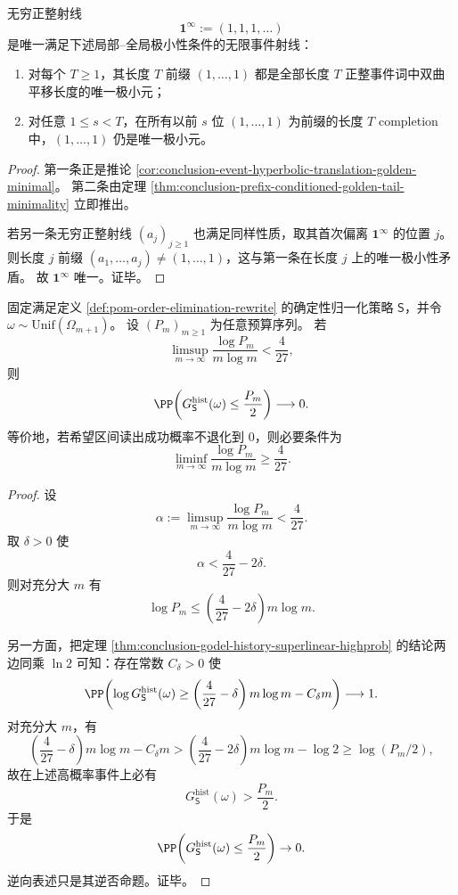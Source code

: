\begin{corollary}[全局最短历史射线的唯一性]\label{cor:conclusion-unique-global-shortest-history-ray}
无穷正整射线
\[
\mathbf 1^\infty:=(1,1,1,\dots)
\]
是唯一满足下述局部--全局极小性条件的无限事件射线：
\begin{enumerate}
  \item 对每个 \(T\ge 1\)，其长度 \(T\) 前缀 \((1,\dots,1)\) 都是全部长度 \(T\) 正整事件词中双曲平移长度的唯一极小元；
  \item 对任意 \(1\le s<T\)，在所有以前 \(s\) 位 \((1,\dots,1)\) 为前缀的长度 \(T\) completion 中，\((1,\dots,1)\) 仍是唯一极小元。
\end{enumerate}
\end{corollary}
\begin{proof}
第一条正是推论 \ref{cor:conclusion-event-hyperbolic-translation-golden-minimal}。
第二条由定理 \ref{thm:conclusion-prefix-conditioned-golden-tail-minimality} 立即推出。

若另一条无穷正整射线 \((a_j)_{j\ge 1}\) 也满足同样性质，取其首次偏离 \(\mathbf 1^\infty\) 的位置 \(j\)。
则长度 \(j\) 前缀 \((a_1,\dots,a_j)\neq (1,\dots,1)\)，这与第一条在长度 \(j\) 上的唯一极小性矛盾。
故 \(\mathbf 1^\infty\) 唯一。证毕。
\end{proof}

\begin{theorem}\label{thm:conclusion-replay-godel-sharp-strong-converse}
固定满足定义 \ref{def:pom-order-elimination-rewrite} 的确定性归一化策略 \(\mathsf S\)，并令 \(\omega\sim\mathrm{Unif}(\Omega_{m+1})\)。
设 \((P_m)_{m\ge 1}\) 为任意预算序列。
若
\[
\limsup_{m\to\infty}\frac{\log P_m}{m\log m}<\frac{4}{27},
\]
则
\[
\PP\!\left(
G_{\mathsf S}^{\mathrm{hist}}(\omega)\le \frac{P_m}{2}
\right)\longrightarrow 0.
\]
等价地，若希望区间读出成功概率不退化到 \(0\)，则必要条件为
\[
\liminf_{m\to\infty}\frac{\log P_m}{m\log m}\ge \frac{4}{27}.
\]
\end{theorem}
\begin{proof}
设
\[
\alpha:=\limsup_{m\to\infty}\frac{\log P_m}{m\log m}<\frac{4}{27}.
\]
取 \(\delta>0\) 使
\[
\alpha<\frac{4}{27}-2\delta.
\]
则对充分大 \(m\) 有
\[
\log P_m\le \left(\frac{4}{27}-2\delta\right)m\log m.
\]

另一方面，把定理 \ref{thm:conclusion-godel-history-superlinear-highprob} 的结论两边同乘 \(\ln 2\) 可知：存在常数 \(C_\delta>0\) 使
\[
\PP\!\left(
\log G_{\mathsf S}^{\mathrm{hist}}(\omega)\ge
\left(\frac{4}{27}-\delta\right)m\log m-C_\delta m
\right)\longrightarrow 1.
\]
对充分大 \(m\)，有
\[
\left(\frac{4}{27}-\delta\right)m\log m-C_\delta m
>
\left(\frac{4}{27}-2\delta\right)m\log m-\log 2
\ge
\log(P_m/2),
\]
故在上述高概率事件上必有
\[
G_{\mathsf S}^{\mathrm{hist}}(\omega)>\frac{P_m}{2}.
\]
于是
\[
\PP\!\left(
G_{\mathsf S}^{\mathrm{hist}}(\omega)\le \frac{P_m}{2}
\right)\to 0.
\]
逆向表述只是其逆否命题。证毕。
\end{proof}

